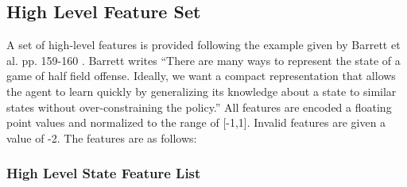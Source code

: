 \documentclass[12pt]{article}
\begin{document}
\subsection{High Level Feature Set}
A set of high-level features is provided following the example given
by Barrett et al. pp. 159-160 \cite{THESIS14-Barrett}. Barrett writes
``There are many ways to represent the state of a game of half field
offense.  Ideally, we want a compact representation that allows the
agent to learn quickly by generalizing its knowledge about a state to
similar states without over-constraining the policy.'' All features
are encoded a floating point values and normalized to the range of
[-1,1]. Invalid features are given a value of -2. The features are as
follows:

\subsubsection{High Level State Feature List}
\end{document}
